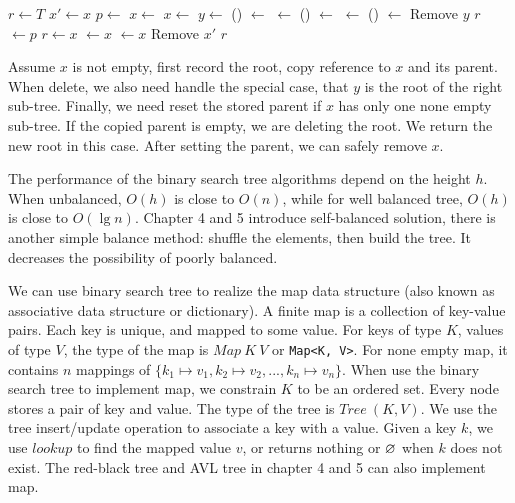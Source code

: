 \documentclass[b5paper]{article}
\begin{document}
\begin{algorithmic}[1]
  \State $r \gets T$
  \State $x' \gets x$ 
  \State $p \gets $ 
    \State $x \gets $ 
    \State $x \gets $ 
  \Else
    \State  $y \gets $ ()
    \State {} $\gets$ 
    \State {} $\gets$ 
      \State {}() $\gets$ 
    \Else
      \State {} $\gets$ 
    \EndIf
      \State {}() $\gets$ 
    \EndIf
    \State Remove $y$
    \State \Return $r$
  \EndIf
    \State {} $\gets p$
  \EndIf
    \State $r \gets x$
  \Else
      \State {} $\gets x$
    \Else
      \State {} $\gets x$
    \EndIf
  \EndIf
  \State Remove $x'$
  \State \Return $r$
\EndFunction
\end{algorithmic}

Assume $x$ is not empty, first record the root, copy reference to $x$ and its parent. When delete, we also need handle the special case, that $y$ is the root of the right sub-tree. Finally, we need reset the stored parent if $x$ has only one none empty sub-tree. If the copied parent is empty, we are deleting the root. We return the new root in this case. After setting the parent, we can safely remove $x$.

The performance of the binary search tree algorithms depend on the height $h$. When unbalanced, $O(h)$ is close to $O(n)$, while for well balanced tree, $O(h)$ is close to $O(\lg n)$. Chapter 4 and 5 introduce self-balanced solution, there is another simple balance method: shuffle the elements, then build the tree\cite{CLRS}. It decreases the possibility of poorly balanced.

We can use binary search tree to realize the map data structure (also known as associative data structure or dictionary). A finite map is a collection of key-value pairs. Each key is unique, and mapped to some value. For keys of type $K$, values of type $V$, the type of the map is $Map\ K\ V$ or \texttt{Map<K, V>}. For none empty map, it contains $n$ mappings of $\{k_1 \mapsto v_1, k_2 \mapsto v_2, ..., k_n \mapsto v_n\}$. When use the binary search tree to implement map, we constrain $K$ to be an ordered set. Every node stores a pair of key and value. The type of the tree is $Tree\ (K, V)$. We use the tree insert/update operation to associate a key with a value. Given a key $k$, we use $lookup$ to find the mapped value $v$, or returns nothing or $\varnothing$ when $k$ does not exist. The red-black tree and AVL tree in chapter 4 and 5 can also implement map.
\end{document}
